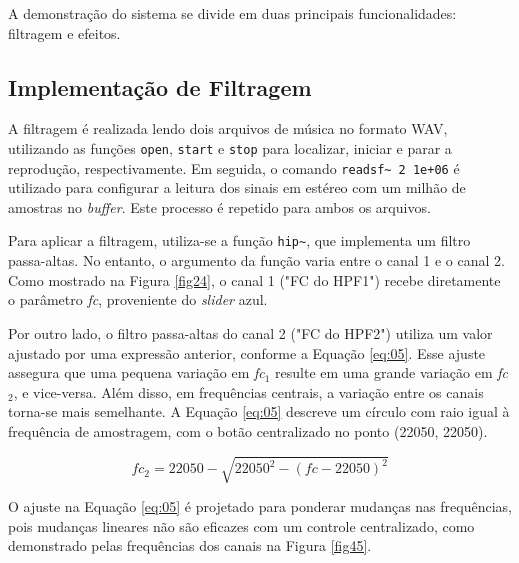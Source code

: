 A demonstração do sistema se divide em duas principais funcionalidades: filtragem e efeitos.

\subsection{Implementação de Filtragem}

A filtragem é realizada lendo dois arquivos de música no formato WAV, utilizando as funções \texttt{open}, \texttt{start} e \texttt{stop} para localizar, iniciar e parar a reprodução, respectivamente. Em seguida, o comando \texttt{readsf\textasciitilde\ 2 1e+06} é utilizado para configurar a leitura dos sinais em estéreo com um milhão de amostras no \textit{buffer}. Este processo é repetido para ambos os arquivos.

Para aplicar a filtragem, utiliza-se a função \texttt{hip\textasciitilde}, que implementa um filtro passa-altas. No entanto, o argumento da função varia entre o canal 1 e o canal 2. Como mostrado na Figura \ref{fig24}, o canal 1 ("FC do HPF1") recebe diretamente o parâmetro \textit{fc}, proveniente do \textit{slider} azul.

Por outro lado, o filtro passa-altas do canal 2 ("FC do HPF2") utiliza um valor ajustado por uma expressão anterior, conforme a Equação \ref{eq:05}. Esse ajuste assegura que uma pequena variação em \textit{fc$_{1}$} resulte em uma grande variação em \textit{fc$_{2}$}, e vice-versa. Além disso, em frequências centrais, a variação entre os canais torna-se mais semelhante. A Equação \ref{eq:05} descreve um círculo com raio igual à frequência de amostragem, com o botão centralizado no ponto (22050, 22050).

\begin{equation}  \label{eq:05}
    fc_2 = 22050 - \sqrt{22050^2 - (fc - 22050)^2}
\end{equation}

O ajuste na Equação \ref{eq:05} é projetado para ponderar mudanças nas frequências, pois mudanças lineares não são eficazes com um controle centralizado, como demonstrado pelas frequências dos canais na Figura \ref{fig45}.


